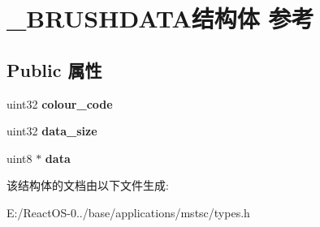 \hypertarget{struct___b_r_u_s_h_d_a_t_a}{}\section{\+\_\+\+B\+R\+U\+S\+H\+D\+A\+T\+A结构体 参考}
\label{struct___b_r_u_s_h_d_a_t_a}
\subsection*{Public 属性}
\begin{DoxyCompactItemize}
\item 
\mbox{\label{struct___b_r_u_s_h_d_a_t_a_aa849be76fd5ed4c253e787411875d46a}} 
uint32 {\bfseries colour\+\_\+code}
\item 
\mbox{\label{struct___b_r_u_s_h_d_a_t_a_a82f167c383cee3fc068ac54dd41a89f7}} 
uint32 {\bfseries data\+\_\+size}
\item 
\mbox{\label{struct___b_r_u_s_h_d_a_t_a_a8e0e6a20b333aa0d4bb5483fe62410d7}} 
uint8 $\ast$ {\bfseries data}
\end{DoxyCompactItemize}


该结构体的文档由以下文件生成\+:\begin{DoxyCompactItemize}
\item 
E\+:/\+React\+O\+S-\/0../base/applications/mstsc/types.\+h\end{DoxyCompactItemize}
